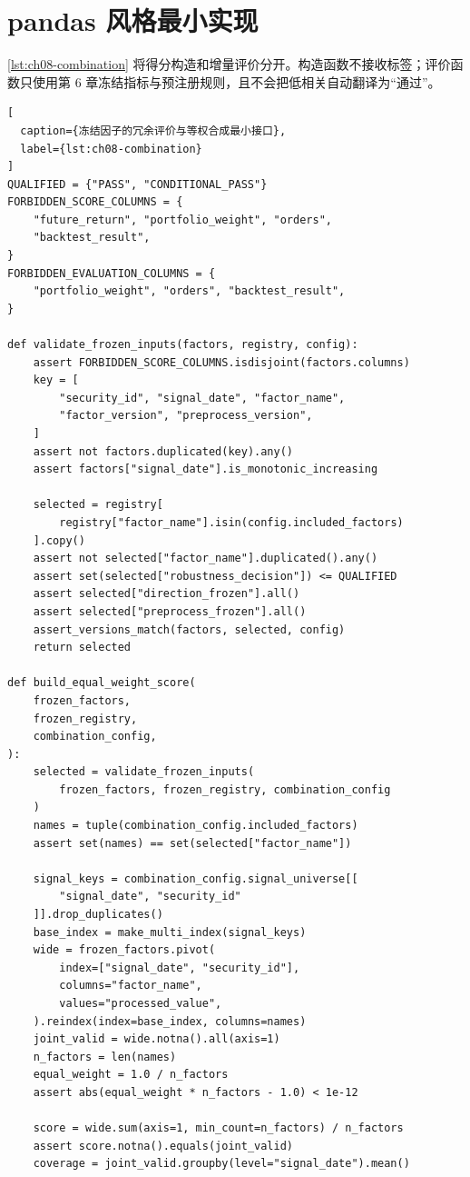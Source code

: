 \section{pandas 风格最小实现}

\cref{lst:ch08-combination} 将得分构造和增量评价分开。构造函数不接收标签；评价函数只使用第 6 章冻结指标与预注册规则，且不会把低相关自动翻译为“通过”。

\begin{lstlisting}[
  caption={冻结因子的冗余评价与等权合成最小接口},
  label={lst:ch08-combination}
]
QUALIFIED = {"PASS", "CONDITIONAL_PASS"}
FORBIDDEN_SCORE_COLUMNS = {
    "future_return", "portfolio_weight", "orders",
    "backtest_result",
}
FORBIDDEN_EVALUATION_COLUMNS = {
    "portfolio_weight", "orders", "backtest_result",
}

def validate_frozen_inputs(factors, registry, config):
    assert FORBIDDEN_SCORE_COLUMNS.isdisjoint(factors.columns)
    key = [
        "security_id", "signal_date", "factor_name",
        "factor_version", "preprocess_version",
    ]
    assert not factors.duplicated(key).any()
    assert factors["signal_date"].is_monotonic_increasing

    selected = registry[
        registry["factor_name"].isin(config.included_factors)
    ].copy()
    assert not selected["factor_name"].duplicated().any()
    assert set(selected["robustness_decision"]) <= QUALIFIED
    assert selected["direction_frozen"].all()
    assert selected["preprocess_frozen"].all()
    assert_versions_match(factors, selected, config)
    return selected

def build_equal_weight_score(
    frozen_factors,
    frozen_registry,
    combination_config,
):
    selected = validate_frozen_inputs(
        frozen_factors, frozen_registry, combination_config
    )
    names = tuple(combination_config.included_factors)
    assert set(names) == set(selected["factor_name"])

    signal_keys = combination_config.signal_universe[[
        "signal_date", "security_id"
    ]].drop_duplicates()
    base_index = make_multi_index(signal_keys)
    wide = frozen_factors.pivot(
        index=["signal_date", "security_id"],
        columns="factor_name",
        values="processed_value",
    ).reindex(index=base_index, columns=names)
    joint_valid = wide.notna().all(axis=1)
    n_factors = len(names)
    equal_weight = 1.0 / n_factors
    assert abs(equal_weight * n_factors - 1.0) < 1e-12

    score = wide.sum(axis=1, min_count=n_factors) / n_factors
    assert score.notna().equals(joint_valid)
    coverage = joint_valid.groupby(level="signal_date").mean()


\end{lstlisting}
